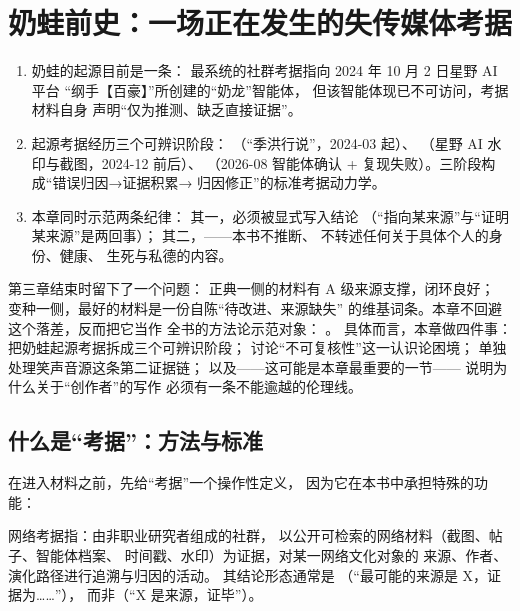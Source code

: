 \chapter{奶蛙前史：一场正在发生的失传媒体考据}\label{ch:04}

\begin{nlkeypoints}
  \begin{enumerate}[label=(\arabic*),leftmargin=2.4em]
    \item 奶蛙的起源目前是一条：
          最系统的社群考据指向 2024 年 10 月 2 日星野 AI 平台
          “纲手【百豪】”所创建的“奶龙”智能体，
          但该智能体现已不可访问，考据材料自身
          声明“仅为推测、缺乏直接证据”。
    \item 起源考据经历三个可辨识阶段：
          （“季洪行说”，2024-03 起）、
          （星野 AI 水印与截图，2024-12 前后）、
          （2026-08 智能体确认 +
          复现失败）。三阶段构成“错误归因→证据积累→
          归因修正”的标准考据动力学。
    \item 本章同时示范两条纪律：
          其一，必须被显式写入结论
          （“指向某来源”与“证明某来源”是两回事）；
          其二，——本书不推断、
          不转述任何关于具体个人的身份、健康、
          生死与私德的内容。
  \end{enumerate}
\end{nlkeypoints}

第三章结束时留下了一个问题：
正典一侧的材料有 A 级来源支撑，闭环良好；
变种一侧，最好的材料是一份自陈“待改进、来源缺失”
的维基词条。本章不回避这个落差，反而把它当作
全书的方法论示范对象：
。
具体而言，本章做四件事：
把奶蛙起源考据拆成三个可辨识阶段；
讨论“不可复核性”这一认识论困境；
单独处理笑声音源这条第二证据链；
以及——这可能是本章最重要的一节——
说明为什么关于“创作者”的写作
必须有一条不能逾越的伦理线。

\section{什么是“考据”：方法与标准}\label{sec:04:method}

在进入材料之前，先给“考据”一个操作性定义，
因为它在本书中承担特殊的功能：

\begin{definition}\label{def:04:kaoju}
  网络考据指：由非职业研究者组成的社群，
  以公开可检索的网络材料（截图、帖子、智能体档案、
  时间戳、水印）为证据，对某一网络文化对象的
  来源、作者、演化路径进行追溯与归因的活动。
  其结论形态通常是
  （“最可能的来源是 X，证据为……”），
  而非（“X 是来源，证毕”）。
\end{definition}

